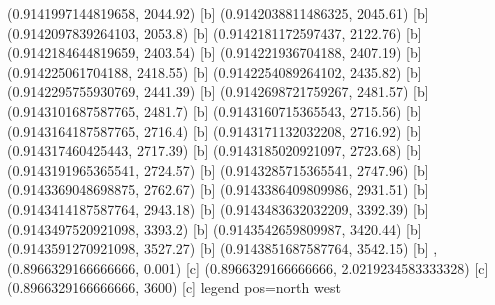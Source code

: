 {{{(0.9141997144819658, 2044.92) [b] 
(0.9142038811486325, 2045.61) [b] 
(0.9142097839264103, 2053.8) [b] 
(0.9142181172597437, 2122.76) [b] 
(0.9142184644819659, 2403.54) [b] 
(0.914221936704188, 2407.19) [b] 
(0.914225061704188, 2418.55) [b] 
(0.9142254089264102, 2435.82) [b] 
(0.9142295755930769, 2441.39) [b] 
(0.9142698721759267, 2481.57) [b] 
(0.9143101687587765, 2481.7) [b] 
(0.9143160715365543, 2715.56) [b] 
(0.9143164187587765, 2716.4) [b] 
(0.9143171132032208, 2716.92) [b] 
(0.914317460425443, 2717.39) [b] 
(0.9143185020921097, 2723.68) [b] 
(0.9143191965365541, 2724.57) [b] 
(0.9143285715365541, 2747.96) [b] 
(0.9143369048698875, 2762.67) [b] 
(0.9143386409809986, 2931.51) [b] 
(0.9143414187587764, 2943.18) [b] 
(0.9143483632032209, 3392.39) [b] 
(0.9143497520921098, 3393.2) [b] 
(0.9143542659809987, 3420.44) [b] 
(0.9143591270921098, 3527.27) [b] 
(0.9143851687587764, 3542.15) [b] 
},{(0.8966329166666666, 0.001) [c] 
(0.8966329166666666, 2.0219234583333328) [c] 
(0.8966329166666666, 3600) [c] 
}}}{legend pos=north west}